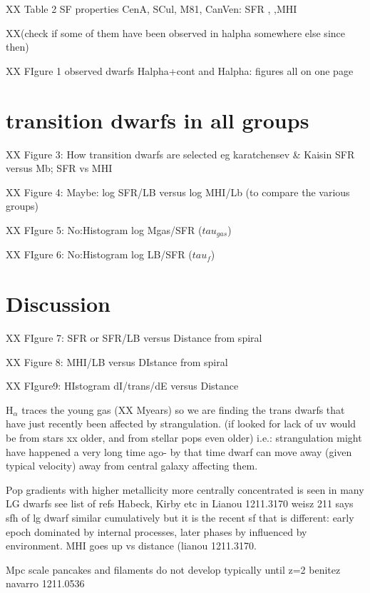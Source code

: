 \documentclass[12pt,preprint]{aastex}
\begin{document}
XX Table 2 SF properties CenA, SCul, M81, CanVen: SFR , ,MHI 

 
XX(check if some of them have been observed in halpha somewhere else since then)

XX FIgure 1 observed dwarfs Halpha+cont and Halpha:  figures all on one page


\section{transition dwarfs in all groups}



XX Figure 3: How transition dwarfs are selected eg karatchensev \& Kaisin SFR versus Mb; SFR vs MHI
 
XX Figure 4: Maybe: log SFR/LB versus log MHI/Lb (to compare the various groups)

XX FIgure 5: No:Histogram log Mgas/SFR ($tau_{gas}$)

XX FIgure 6: No:Histogram log LB/SFR ($tau_f$)



\section{Discussion} 


XX FIgure 7: SFR or SFR/LB versus Distance from spiral

XX Figure 8: MHI/LB versus DIstance from spiral

XX FIgure9: HIstogram dI/trans/dE versus Distance



H$_\alpha$ traces the young gas (XX Myears) so we are finding the trans dwarfs that have just recently been affected by strangulation. (if looked for lack 
of uv would be from stars xx older, and from stellar pops even older) i.e.: strangulation might have happened a very long time ago- by that time dwarf can 
move away (given typical velocity) away from central galaxy affecting them.

Pop gradients with higher metallicity more centrally concentrated is seen in many LG dwarfs see list of refs Habeck, Kirby etc in Lianou 1211.3170
weisz 211 says sfh of lg dwarf similar cumulatively but it is the recent sf that is different: early epoch dominated by internal processes, later phases by 
influenced by environment. MHI goes up vs distance (lianou 1211.3170.

Mpc scale pancakes and filaments do not develop typically until z=2 benitez navarro 1211.0536
\end{document}
